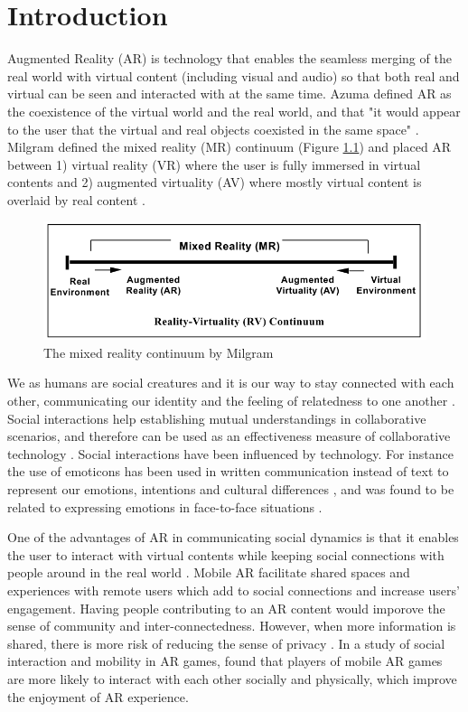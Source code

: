 \chapter{Introduction}
\label{ch:intro}

Augmented Reality (AR) is technology that enables the seamless merging of the real world with virtual content (including visual and audio) so that both real and virtual can be seen and interacted with at the same time. Azuma defined AR as the coexistence of the virtual world and the real world, and that "it would appear to the user that the virtual and real objects coexisted in the same space"  \cite{azuma1997survey}. Milgram defined the mixed reality (MR) continuum (Figure \ref{fig:mr-continuum}) and placed AR between 1) virtual reality (VR) where the user is fully immersed in virtual contents and 2) augmented virtuality (AV) where mostly virtual content is overlaid by real content \cite{Milgram1995a}. 

\begin{figure}
    \centering
    \includegraphics[width=.8\linewidth]{images/mixed-reality-continuum.png}
    \caption{The mixed reality continuum by Milgram \cite{Milgram1995a}}
    \label{fig:mr-continuum}
\end{figure}

We as humans are social creatures and it is our way to stay connected with each other, communicating our identity and the feeling of relatedness to one another \cite{HuangWeidong2013}. Social interactions help establishing mutual understandings in collaborative scenarios, and therefore can be used as an effectiveness measure of collaborative technology \cite{Li2013}. Social interactions have been influenced by technology. For instance the use of emoticons has been used in written communication instead of text to represent our emotions, intentions and cultural differences \cite{Pavalanathan2016}, and was found to be related to expressing emotions in face-to-face situations \cite{Derks2007}. 

One of the advantages of AR in communicating social dynamics is that it enables the user to interact with virtual contents while keeping social connections with people around in the real world \cite{HuangWeidong2013}. Mobile AR facilitate shared spaces and experiences with remote users which add to social connections and increase users' engagement. Having people contributing to an AR content would imporove the sense of community and inter-connectedness. However, when more information is shared, there is more risk of reducing the sense of privacy \cite{Olsson2013}. In a study of social interaction and mobility in AR games, \textcite{Schmalstieg_144} found that players of mobile AR games are more likely to interact with each other socially and physically, which improve the enjoyment of AR experience. 

